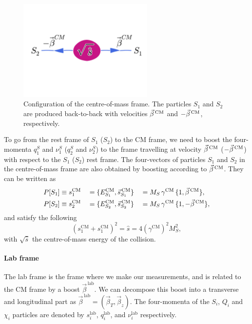 \begin{figure}[htpb]
  \centering
  \includegraphics[width=0.6\textwidth,clip=true,trim=0 5.5cm 0
4.5cm]{figures/razor_variables/cm_frame} 
  \caption{Configuration of the centre-of-mass frame. The particles $S_1$ and $S_2$ are
produced back-to-back with velocities $\vec{\beta}^{\,\textrm{CM}}$ and $-\vec{\beta}^{\,\textrm{CM}}$, respectively. 
\label{fig:razor_CM_frame}}
\end{figure}

To go from the rest frame of $S_1$ ($S_2$) to the CM frame, we need to boost the four-momenta
$q_1^S$ and $\nu_1^S$ ($q_2^S$ and $\nu_2^S$) to the frame travelling at velocity $\vec{\beta}^{\,\textrm{CM}}$
($-\vec{\beta}^{\,\textrm{CM}}$) with respect to the $S_1$ ($S_2$) rest frame. 
The four-vectors of particles $S_1$ and $S_2$ in the centre-of-mass frame are also obtained by
boosting according to $\vec{\beta}^{\,\textrm{CM}}$. They can be written as
\begin{alignat}{6}
  P[S_1] &\equiv s^{\textrm{CM}}_1  &&= \{ E^{\textrm{CM}}_{S_1} , \vec{s}^{\,\textrm{CM}}_{S_1}\} 
&&= M_S \, \gamma^{\textrm{CM}} \, \{ 1 , \vec{\beta}^{\,\textrm{CM}}\} , \\ 
  P[S_2] &\equiv s^{\textrm{CM}}_2 &&= \{ E^{\textrm{CM}}_{S_2} , \vec{s}^{\,\textrm{CM}}_{S_2}\}
&&= M_S \, \gamma^{\textrm{CM}} \, \{ 1 , -\vec{\beta}^{\,\textrm{CM}}\},  
\end{alignat}
and satisfy the following
\begin{equation}
  (s^{\textrm{CM}}_1 + s^{\textrm{CM}}_1)^2 = \hat{s} = 4 (\gamma^{\textrm{CM}})^2 M_S^2,
\end{equation}
with $\sqrt{\hat{s}}$ the centre-of-mass energy of the collision. 


\paragraph{Lab frame}
The lab frame is the frame where we make our measurements, and is related to the CM frame by a
boost $\vec{\beta}^{\,\textrm{lab}}$. We can decompose this boost into a transverse and longitudinal
part as $\vec{\beta}^{\,\textrm{lab}} = (\vec{\beta}_T,\vec{\beta}_z)$. 
The four-momenta of the $S_i$, $Q_i$ and $\chi_i$ particles are denoted by $s^{\textrm{lab}}_i$,
$q^{\textrm{lab}}_i$, and $\nu^{\textrm{lab}}_i$ respectively. 



